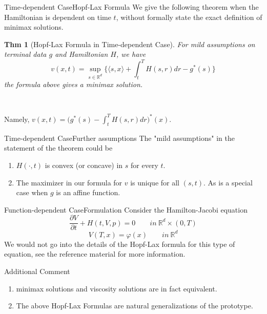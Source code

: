 \documentclass[english]{pkuslide}
\newtheorem{Thm}{Thm}
\begin{document}
\begin{frame}{Time-dependent Case}{Hopf-Lax Formula}
We give the following theorem when the Hamiltonian is dependent on time $t$, without formally state the exact definition of minimax solutions.
\begin{Thm}[Hopf-Lax Formula in Time-dependent Case]
For mild assumptions on terminal data $g$ and Hamiltonian $H$, we have
 \begin{equation}
v(x,t) = \sup_{s \in \mathbb{R}^{d}}\{\langle s,x \rangle+\int_{t}^{T}H(s,r)dr-g^{*}(s)\}
\end{equation}
the formula above gives a minimax solution. 
	\end{Thm}
	\ 
	
Namely, $v(x,t)=\bigg( g^{*}(s)-\int_{t}^{T}H(s,r)dr\bigg) ^{*}(x)$.
\end{frame}
\begin{frame}{Time-dependent Case}{Further assumptions}
The "mild assumptions" in the statement of the theorem could be 
\begin{enumerate}[<+->]
\item $H(\cdot,t)$ is convex (or concave) in $s$ for every $t$.
\item The maximizer in our formula for $v$ is unique for all $(s,t)$. As is a special case when $g$ is an affine function.
\end{enumerate}
\end{frame}
\begin{frame}{Function-dependent Case}{Formulation}
Consider the Hamilton-Jacobi equation
\begin{equation}
\frac{\partial V}{\partial t} + H(t,V,p) = 0  \qquad in\  \mathbb{R}^{d} \times (0,T) 
\end{equation}
\begin{equation}
V(T, x) = \varphi(x)  \qquad in\  \mathbb{R}^{d}
\end{equation}
We would not go into the details of the Hopf-Lax formula for this type of equation, see the reference material for more information.
\end{frame}

\begin{frame}{Additional Comment}
\begin{enumerate}[<+->]
\item minimax solutions and viscosity solutions are in fact equivalent.
\item The above Hopf-Lax Formulas are natural generalizations of the prototype.
\end{enumerate}
\end{frame}
\end{document}
